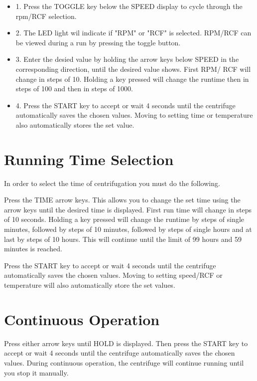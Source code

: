 \documentclass[12pt]{../SOP3_beta}
\begin{document}
\begin{itemize}
  \item 1. Press the TOGGLE key below the SPEED display to cycle through the rpm/RCF selection.
  \item 2. The LED light wil indicate if "RPM" or "RCF" is selected. RPM/RCF can be viewed during a run by pressing the toggle button. 
  \item 3. Enter the desied value by holding the arrow keys below SPEED in the corresponding direction, until the desired value shows. First RPM/ RCF will change in steps of 10. Holding a key pressed will change the runtime then in steps of 100 and then in steps of 1000. 
  \item 4. Press the START key to accept or wait 4 seconds until the centrifuge automatically saves the chosen values. Moving to setting time or temperature also automatically stores the set value. 
\end{itemize}

\section{Running Time Selection}

\NP In order to select the time of centrifugation you must do the following.

\NP Press the TIME arrow keys. This allows you to change the set time using the arrow keys until the desired time is displayed. First run time will change in steps of 10 seconds. Holding a key pressed will change the runtime by steps of single minutes, followed by steps of 10 minutes, followed by steps of single hours and at last by steps of 10 hours. This will continue until the limit of 99 hours and 59 minutes is reached.

\NP Press the START key to accept or wait 4 seconds until the centrifuge automatically saves the chosen values. Moving to setting speed/RCF or temperature will also automatically store the set values. 

\section{Continuous Operation}

\NP Press either arrow keys until HOLD is displayed.
\NP Then press the START key to accept or wait 4 seconds until the centrifuge automatically saves the chosen values. During continuous operation, the centrifuge will continue running until you stop it manually. 
\end{document}
